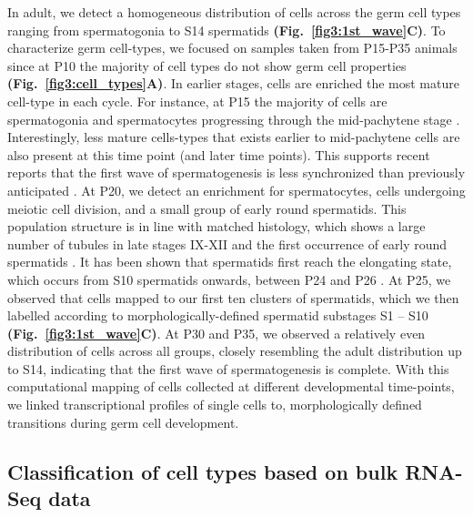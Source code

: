 In adult, we detect a homogeneous distribution of cells across the germ cell types ranging from spermatogonia to S14 spermatids \textbf{(Fig.~\ref{fig3:1st_wave}C)}. To characterize germ cell-types, we focused on samples taken from P15-P35 animals since at P10 the majority of cell types do not show germ cell properties \textbf{(Fig.~\ref{fig3:cell_types}A)}. In earlier stages, cells are enriched the most mature cell-type in each cycle. For instance, at P15 the majority of cells are spermatogonia and spermatocytes progressing through the mid-pachytene stage \citep{Turner2004}. Interestingly, less mature cells-types that exists earlier to mid-pachytene cells are also present at this time point (and later time points). This supports recent reports that the first wave of spermatogenesis is less synchronized than previously anticipated \citep{Snyder2010}. At P20, we detect an enrichment for spermatocytes, cells undergoing meiotic cell division, and a small group of early round spermatids. This population structure is in line with matched histology, which shows a large number of tubules in late stages IX-XII and the first occurrence of early round spermatids \citep{Bellve1977}. It has been shown that spermatids first reach the elongating state, which occurs from S10 spermatids onwards, between P24 and P26 \citep{Janca1986}. At P25, we observed that cells mapped to our first ten clusters of spermatids, which we then labelled according to morphologically-defined spermatid substages S1 – S10 \textbf{(Fig.~\ref{fig3:1st_wave}C)}. At P30 and P35, we observed a relatively even distribution of cells across all groups, closely resembling the adult distribution up to S14, indicating that the first wave of spermatogenesis is complete. With this computational mapping of cells collected at different developmental time-points, we linked transcriptional profiles of single cells to, morphologically defined transitions during germ cell development.

\newpage

\subsection{Classification of cell types based on bulk RNA-Seq data}

